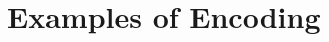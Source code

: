 \section{Examples of Encoding}

\begin{comment}
\subsection{$\recp{X}{\bout{a}{m} \rvar{X}}$}

\subsubsection{Encoding}

\[
	\begin{array}{rcl}
		\pmapp{\recp{X}{\bout{a}{m} \rvar{X}}}{2}{f} & = &
		\newsp{s_1}{ \binp{s_1}{X} \pmapp{\bout{a}{m} \rvar{X}}{2}{f, \rvar{X} \rightarrow x_ax_m} \Par \bout{\dual{s_1}}{ \abs{x_a x_m z} \binp{z}{X} \auxmapp{\pmapp{\bout{a}{m} \rvar{X}}{2}{f, \rvar{X} \rightarrow x_ax_m}}{v}{\es} } \inact}
		\\

		\pmapp{\bout{a}{m} \rvar{X}}{2}{f, \rvar{X} \rightarrow x_ax_m} &=&
		\bout{a}{\abs{x}{\binp{x}{X} \appl{X}{m}}} \pmapp{\rvar{X}}{2}{f, \rvar{X} \rightarrow x_ax_m}
		\\
		&=& \bout{a}{\abs{x}{\binp{x}{X} \appl{X}{m}}} \newsp{s_2}{\appl{X}{a,m, s_2}  \Par \bout{\dual{s_2}}{\abs{x_a x_m z}{\appl{X}{x_a x_m z}}} \inact}
		\\

		\auxmapp{\pmapp{\bout{a}{m} \rvar{X}}{2}{f, \rvar{X} \rightarrow x_ax_m}}{v}{\es} &=&
		\auxmapp{\bout{a}{\abs{x}{\binp{x}{X} \appl{X}{m}}} \newsp{s_2}{\appl{X}{a,m, s_2}  \Par \bout{\dual{s_2}}{\abs{x_a x_m z}{\appl{X}{x_a x_m z}}} \inact}}{v}{\es}
		\\

		& = & \bout{x_a}{\abs{x}{\binp{x}{X} \appl{X}{x_m}}} \auxmapp{\newsp{s_2}{\appl{X}{a,m, s_2}  \Par \bout{\dual{s_2}}{\abs{x_a x_m z}{\appl{X}{x_a x_m z}}} \inact}}{v}{\es}
		\\
		& = & \bout{x_a}{\abs{x}{\binp{x}{X} \appl{X}{x_m}}} \newsp{s_2}{\appl{X}{x_a,x_m, s_2}  \Par \bout{\dual{s_2}}{\abs{x_a x_m z}{\appl{X}{x_a x_m z}}} \inact}
	\end{array}
\]
\noi The whole encoding would be:
\[
	\begin{array}{rcl}
		V & = & \abs{x_a x_m z} \binp{z}{X} \bout{x_a}{\abs{x}{\binp{x}{X} \appl{X}{x_m}}} \newsp{s_2}{\appl{X}{x_a,x_m, s_2}  \Par \bout{\dual{s_2}}{\abs{x_a x_m z}{\appl{X}{x_a x_m z}}} \inact}\\
		P & \scong &
		\newsp{s_1}{\bout{\dual{s_1}}{V} \inact \Par \binp{s_1}{X} \bout{a}{\abs{x}{\binp{x}{X} \appl{X}{m}}} \newsp{s_2}{\bout{\dual{s_2}}{\abs{x_a x_m z}{\appl{X}{x_a x_m z}}} \inact} \Par \appl{X}{a,m, s_2}}
	\end{array}
\]


\end{comment}
